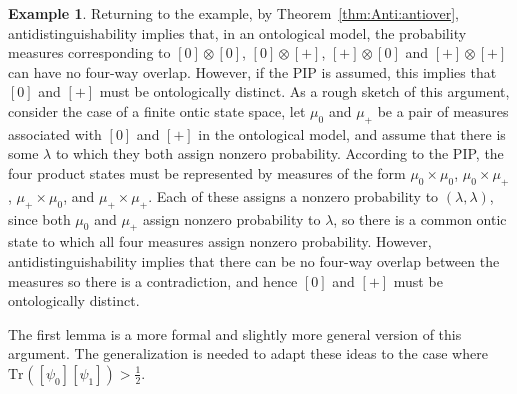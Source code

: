 \documentclass[DIV=calc,paper=a4,fontsize=11pt,twocolumn]{scrartcl} %
\theoremstyle{definition}
\newtheorem{example}[definition]{Example}
\theoremstyle{plain}
\newcommand{\Proj}[1]{\ensuremath{\left [ #1 \right ]}}
\newcommand{\Tr}[2][]{\ensuremath{\text{Tr}_{#1} \left ( #2 \right )}}
\begin{document}
\begin{example}
Returning to the example, by Theorem~\ref{thm:Anti:antiover},
antidistinguishability implies that, in an ontological model, the
probability measures corresponding to $\Proj{0}\otimes \Proj{0}$,
$\Proj{0} \otimes \Proj{+}$, $\Proj{+} \otimes \Proj{0}$ and
$\Proj{+} \otimes \Proj{+}$ can have no four-way overlap.  However,
if the PIP is assumed, this implies that $\Proj{0}$ and $\Proj{+}$
must be ontologically distinct.  As a rough sketch of this argument,
consider the case of a finite ontic state space, let $\mu_{0}$ and
$\mu_{+}$ be a pair of measures associated with $\Proj{0}$ and
$\Proj{+}$ in the ontological model, and assume that there is some
$\lambda$ to which they both assign nonzero probability.  According
to the PIP, the four product states must be represented by measures
of the form $\mu_{0} \times \mu_{0}$, $\mu_{0} \times \mu_{+}$,
$\mu_{+} \times \mu_{0}$, and $\mu_{+} \times \mu_{+}$.  Each of
these assigns a nonzero probability to $(\lambda, \lambda)$, since
both $\mu_{0}$ and $\mu_{+}$ assign nonzero probability to
$\lambda$, so there is a common ontic state to which all four
measures assign nonzero probability.  However,
antidistinguishability implies that there can be no four-way overlap
between the measures so there is a contradiction, and hence
$\Proj{0}$ and $\Proj{+}$ must be ontologically distinct.

The first lemma is a more formal and slightly more general version
of this argument.  The generalization is needed to adapt these ideas
to the case where $\Tr{\Proj{\psi_0}\Proj{\psi_1}} > \frac{1}{2}$.
\end{example}
\end{document}
